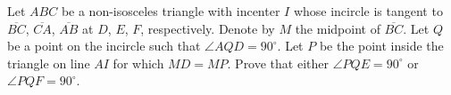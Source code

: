 Let $ABC$ be a non-isosceles triangle with incenter $I$ whose incircle is tangent to $\overline{BC}$, $\overline{CA}$, $\overline{AB}$ at $D$, $E$, $F$, respectively. Denote by $M$ the midpoint of $\overline{BC}$. Let $Q$ be a point on the incircle such that $\angle AQD = 90^{\circ}$.  Let $P$ be the point inside the triangle on line $AI$ for which $MD = MP$.  Prove that either $\angle PQE = 90^{\circ}$ or $\angle PQF = 90^{\circ}$.